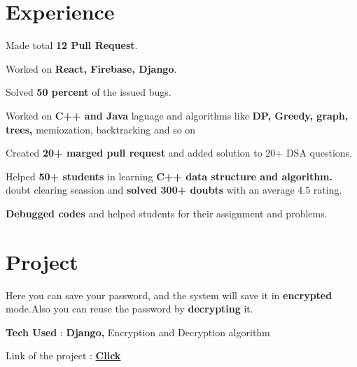 \documentclass[]{deedy-resume-openfont}
\begin{document}
\hfill
\begin{minipage}[t]{0.66\textwidth} 

\section{Experience}

\vspace{\topsep} %
\begin{tightemize}
\item Made total \textbf{12 Pull Request}.
\item Worked on \textbf{React, Firebase, Django}. 
\item Solved \textbf{50 percent} of the issued bugs.
\end{tightemize}
\sectionsep

\begin{tightemize}
\item Worked on\textbf{ C++ and Java }laguage and algorithms like \textbf{DP, Greedy, graph, trees,}
memiozation, backtracking and so on
\item Created\textbf{ 20+ marged pull request} and added solution to 20+ DSA questions.
\end{tightemize}
\sectionsep

\begin{tightemize}
\item Helped\textbf{ 50+ students} in learning \textbf{C++ data structure and algorithm.}
\itemTook doubt clearing seassion and \textbf{solved 300+ doubts} with an average 4.5
rating.
\item\textbf{ Debugged codes} and helped students for their assignment and problems.
\end{tightemize}
\sectionsep


\section{Project}
\begin{tightemize}
 \item Here you can save your password, and the system will save it in \textbf{encrypted} mode.Also you can reuse the password by \textbf{decrypting} it.
\item \textbf{Tech Used} :\textbf{ Django,} Encryption and Decryption algorithm
\item Link of the project :  \textbf{\href{https://github.com/chaltidutta/save-password}{Click}} 
 \end{tightemize}
\sectionsep


\end{minipage}
\end{document}
